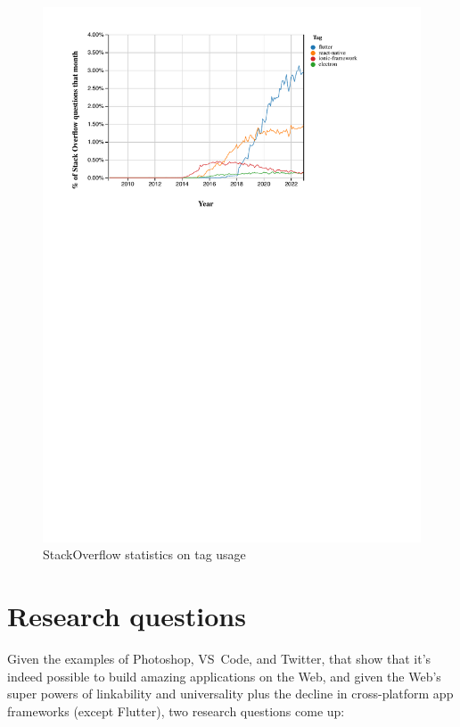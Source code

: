\documentclass[sigconf]{acmart}
\begin{document}
\begin{figure}[H]
    \centering
    \includegraphics[clip, trim=1.5cm 18.2cm 3.5cm 1.25cm, width=\columnwidth]{./stackoverflow.pdf}
    \caption{StackOverflow statistics on tag usage}
    \label{fig:stackoverflow}
\end{figure}

\section{Research questions}

Given the examples of Photoshop, VS~Code, and Twitter, that show that it's indeed possible to build amazing applications on the Web, and given the Web's super powers of linkability and universality plus the decline in cross-platform app frameworks (except Flutter), two research questions come up:
\end{document}
